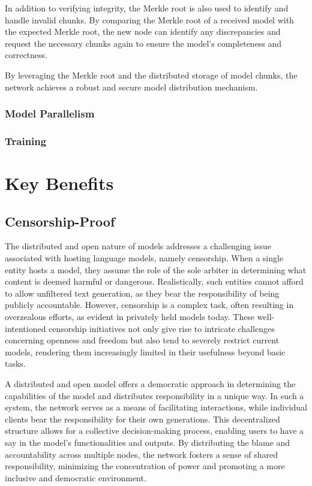 \documentclass{article}
\begin{document}
In addition to verifying integrity, the Merkle root is also used to identify and handle invalid chunks. 
By comparing the Merkle root of a received model with the expected Merkle root, the new node can identify any discrepancies and request the necessary chunks again to ensure the model's completeness and correctness.

By leveraging the Merkle root and the distributed storage of model chunks, the network achieves a robust and secure model distribution mechanism.

\subsubsection{Model Parallelism}
\subsubsection{Training}

\section{Key Benefits}
\subsection{Censorship-Proof}
The distributed and open nature of models addresses a challenging issue associated with hosting language models, namely censorship. 
When a single entity hosts a model, they assume the role of the sole arbiter in determining what content is deemed harmful or dangerous. 
Realistically, such entities cannot afford to allow unfiltered text generation, as they bear the responsibility of being publicly accountable. 
However, censorship is a complex task, often resulting in overzealous efforts, as evident in privately held models today. 
These well-intentioned censorship initiatives not only give rise to intricate challenges concerning openness and freedom but also tend to severely restrict current models, rendering them increasingly limited in their usefulness beyond basic tasks.

A distributed and open model offers a democratic approach in determining the capabilities of the model and distributes responsibility in a unique way. 
In such a system, the network serves as a means of facilitating interactions, while individual clients bear the responsibility for their own generations. 
This decentralized structure allows for a collective decision-making process, enabling users to have a say in the model's functionalities and outputs. 
By distributing the blame and accountability across multiple nodes, the network fosters a sense of shared responsibility, minimizing the concentration of power and promoting a more inclusive and democratic environment.
\end{document}
